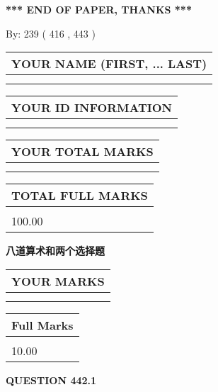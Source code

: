 \documentclass{ctexart}
\begin{document}
   
 \vspace{0.2in}
 
   
   
   
   
\vspace{1.0in} 
{\textbf{\large{ *** END OF PAPER, THANKS *** }}} 
   
   
\hspace{1.0in} By: 
 239 ( 416 ,  443 )
   
   
   
   
\newpage 
\setcounter{page}{ 
   442001 } 
   
   
   
   
\noindent\begin{tabular}{|l|}
\hline
YOUR NAME (FIRST, ... LAST)  \\
\hline
 \\ 
 \\ 
\hline
\end{tabular}
\hspace{0.05in} \begin{tabular}{|l|}
\hline
 YOUR   ID   INFORMATION  \\
\hline
 \\ 
 \\ 
\hline
\end{tabular}
   
   
\vspace{0.2in}\noindent\begin{tabular}{|l|}
\hline
YOUR TOTAL MARKS  \\
\hline
 \\ 
 \\ 
\hline
\end{tabular}
\hspace{0.05in} \begin{tabular}{|l|}
\hline
TOTAL FULL MARKS  \\
\hline
 \\ 
100.00 \\
\hline
\end{tabular}
   
   
 \vspace{0.2in}
{\LARGE {\textbf{ 八道算术和两个选择题}}}
   
   
  
\vspace{0.2in}
  
\noindent\begin{tabular}{|l|}
\hline
 YOUR MARKS  \\
\hline
 \\ 
 \\ 
\hline
\end{tabular}
\hspace{0.05in} \begin{tabular}{|l|}
\hline
 Full Marks  \\
\hline
 \\ 
10.00 \\
\hline
\end{tabular}
{\textbf{\Large{QUESTION
442.1 
}}}
  
\end{document}
